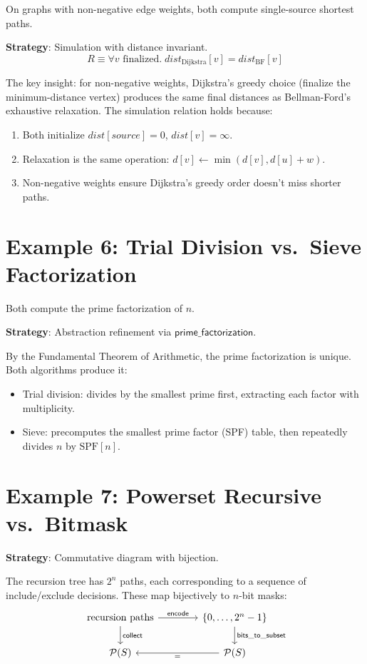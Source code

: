 On graphs with non-negative edge weights, both compute single-source
shortest paths.

\textbf{Strategy}: Simulation with distance invariant.
\[
  R \equiv \forall v \text{ finalized}.\;
  \mathit{dist}_{\mathrm{Dijkstra}}[v] = \mathit{dist}_{\mathrm{BF}}[v]
\]

The key insight: for non-negative weights, Dijkstra's greedy choice
(finalize the minimum-distance vertex) produces the same final distances
as Bellman-Ford's exhaustive relaxation.  The simulation relation holds
because:
\begin{enumerate}
\item Both initialize $\mathit{dist}[\mathit{source}] = 0$,
  $\mathit{dist}[v] = \infty$.
\item Relaxation is the same operation: $d[v] \gets \min(d[v], d[u]+w)$.
\item Non-negative weights ensure Dijkstra's greedy order doesn't miss
  shorter paths.
\end{enumerate}


\section{Example 6: Trial Division vs.\ Sieve Factorization}

Both compute the prime factorization of $n$.

\textbf{Strategy}: Abstraction refinement via
$\mathsf{prime\_factorization}$.

By the Fundamental Theorem of Arithmetic, the prime factorization is
unique.  Both algorithms produce it:
\begin{itemize}
\item Trial division: divides by the smallest prime first, extracting
  each factor with multiplicity.
\item Sieve: precomputes the smallest prime factor (SPF) table, then
  repeatedly divides $n$ by $\mathrm{SPF}[n]$.
\end{itemize}


\section{Example 7: Powerset Recursive vs.\ Bitmask}

\textbf{Strategy}: Commutative diagram with bijection.

The recursion tree has $2^n$ paths, each corresponding to a sequence
of include/exclude decisions.  These map bijectively to $n$-bit masks:
\[
\begin{tikzcd}[column sep=4em]
  \text{recursion paths} \arrow[r, "\mathsf{encode}"] \arrow[d, "\mathsf{collect}"]
    & \{0,\ldots,2^n-1\} \arrow[d, "\mathsf{bits\_to\_subset}"] \\
  \mathcal{P}(S) & \mathcal{P}(S) \arrow[l, "="]
\end{tikzcd}
\]

